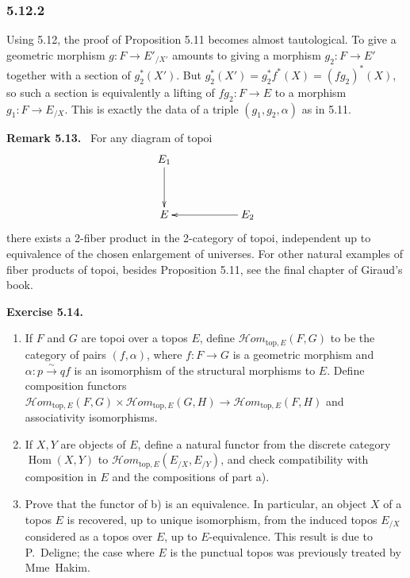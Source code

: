 \documentclass[11pt]{article}
\newcommand{\Hom}{\operatorname{Hom}}
\newenvironment{remarktext}[1]{\par\medskip\noindent\textbf{#1.}\ }{\par\medskip}
\begin{document}
\subsubsection*{5.12.2}
Using 5.12, the proof of Proposition 5.11 becomes almost tautological. To give a geometric morphism \(g:F\to E'_{/X'}\) amounts to giving a morphism \(g_2:F\to E'\) together with a section of \(g_2^*(X')\). But \(g_2^*(X')=g_2^*f^*(X)=(fg_2)^*(X)\), so such a section is equivalently a lifting of \(fg_2:F\to E\) to a morphism \(g_1:F\to E_{/X}\). This is exactly the data of a triple \((g_1,g_2,\alpha)\) as in 5.11.

\begin{remarktext}{Remark 5.13}
For any diagram of topoi
\[
\xymatrix@C=2cm@R=1.25cm{E_1\ar[d]\\ E & E_2\ar[l]}
\]
there exists a 2-fiber product in the 2-category of topoi, independent up to equivalence of the chosen enlargement of universes. For other natural examples of fiber products of topoi, besides Proposition 5.11, see the final chapter of Giraud's book.
\end{remarktext}

\begin{remarktext}{Exercise 5.14}
\begin{enumerate}[label=\alph*)]
\item If \(F\) and \(G\) are topoi over a topos \(E\), define \(\mathcal{H}om_{\mathrm{top},E}(F,G)\) to be the category of pairs \((f,\alpha)\), where \(f:F\to G\) is a geometric morphism and \(\alpha:p\xrightarrow{\sim}qf\) is an isomorphism of the structural morphisms to \(E\). Define composition functors \(\mathcal{H}om_{\mathrm{top},E}(F,G)\times\mathcal{H}om_{\mathrm{top},E}(G,H)\to\mathcal{H}om_{\mathrm{top},E}(F,H)\) and associativity isomorphisms.
\item If \(X,Y\) are objects of \(E\), define a natural functor from the discrete category \(\Hom(X,Y)\) to \(\mathcal{H}om_{\mathrm{top},E}(E_{/X},E_{/Y})\), and check compatibility with composition in \(E\) and the compositions of part a).
\item Prove that the functor of b) is an equivalence. In particular, an object \(X\) of a topos \(E\) is recovered, up to unique isomorphism, from the induced topos \(E_{/X}\) considered as a topos over \(E\), up to \(E\)-equivalence. This result is due to P.~Deligne; the case where \(E\) is the punctual topos was previously treated by Mme~Hakim.
\end{enumerate}
\end{remarktext}
\end{document}
